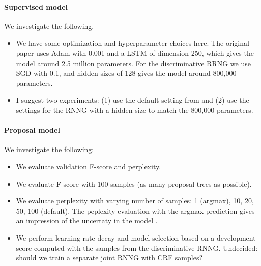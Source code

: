 \paragraph{Supervised model} We investigate the following.
\begin{itemize}
  \item We have some optimization and hyperparameter choices here. The original paper uses Adam with 0.001 and a LSTM of dimension 250, which gives the model around 2.5 million parameters. For the discriminative RRNG we use SGD with 0.1, and hidden sizes of 128 gives the model around 800,000 parameters.
  \item I suggest two experiments: (1) use the default setting from \citep{stern2017minimal} and (2) use the settings for the RNNG with a hidden size to match the 800,000 parameters.
\end{itemize}

\paragraph{Proposal model} We investigate the following:
\begin{itemize}
  \item We evaluate validation F-score and perplexity.
  \item We evaluate F-score with 100 samples (as many proposal trees as possible).
  \item We evaluate perplexity with varying number of samples: 1 (argmax), 10, 20, 50, 100 (default). The peplexity evaluation with the argmax prediction gives an impression of the uncertaty in the model \citep{Buys+2018}.
  \item  We perform learning rate decay and model selection based on a development score computed with the samples from the discriminative RNNG. Undecided: should we train a separate joint RNNG with CRF samples?
\end{itemize}

